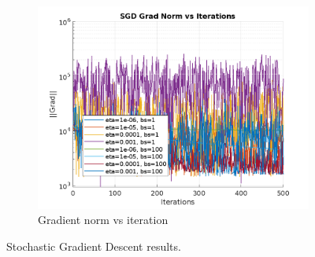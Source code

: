 \documentclass{article}
\begin{document}
\begin{figure}[H]
\begin{subfigure}[b]{0.3\textwidth}
    \includegraphics[width=\textwidth]{images/sgd_grad_norm_vs_iterations.png}
    \caption{Gradient norm vs iteration}
    \label{fig:sgd_grad_norm}
  \end{subfigure}
  \caption{Stochastic Gradient Descent results.}
  \label{fig:sgd_results}
\end{figure}
\end{document}
